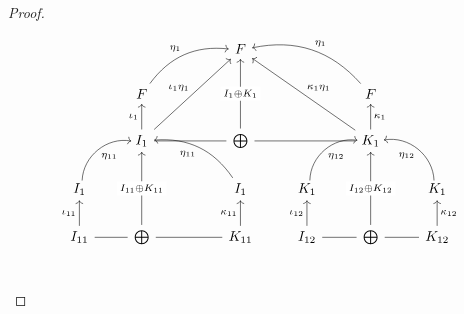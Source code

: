 \begin{proof}
\begin{subproof}
\[
\begin{tikzcd}
                                                   &                                                           &                                                                                   &                                                    & F                                                          &                                                           &                                                                                       &                                                           &                                                     \\
                                                   &                                                           & F \arrow[rru, "\eta_{1}", bend left]                                              &                                                    &                                                            &                                                           & F \arrow[llu, "\eta_{1}"', bend right]                                                &                                                           &                                                     \\
                                                   &                                                           & I_{1} \arrow[u, "\iota_{1}"] \arrow[rr, dash] \arrow[rruu, "\iota_{1}\eta_{1}"] &                                                    & \bigoplus \arrow[uu, "I_{1} \oplus K_{1}" description]     &                                                           & K_{1} \arrow[u, "\kappa_{1}"'] \arrow[ll, dash] \arrow[lluu, "\kappa_{1}\eta_{1}"'] &                                                           &                                                     \\
                                                   & I_{1} \arrow[ru, "\eta_{11}"', bend left=49, shift right] &                                                                                   &                                                    & I_{1} \arrow[llu, "\eta_{11}", bend right]                  & K_{1} \arrow[ru, "\eta_{12}"', bend left=49, shift right] &                                                                                       & K_{1} \arrow[lu, "\eta_{12}", bend right=49, shift left]  &                                                     \\
                                                   & I_{11} \arrow[u, "\iota_{11}"] \arrow[r, dash]          & \bigoplus \arrow[uu, "I_{11}\oplus K_{11}" description]                           &                                                    & K_{11} \arrow[ll, dash] \arrow[u, "\kappa_{11}"]         & I_{12} \arrow[u, "\iota_{12}"] \arrow[r, dash]          & \bigoplus \arrow[uu, "I_{12} \oplus K_{12}" description]                              & K_{12} \arrow[u, "\kappa_{12}"'] \arrow[l, dash]        &                                                     \\

\end{tikzcd}\]
\end{subproof}
\end{proof}
